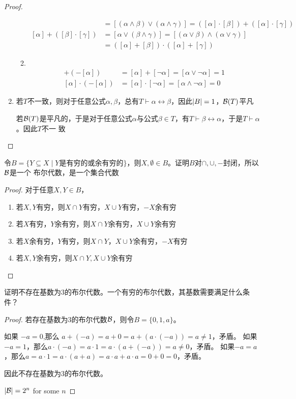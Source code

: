\documentclass[11pt]{article}
\begin{document}
\begin{proof}
\begin{enumerate}
\begin{enumerate}
\begin{align*}
 &=[(\alpha\wedge\beta)\vee(\alpha\wedge\gamma)]=([\alpha]\cdot[\beta])+([\alpha]\cdot[\gamma])\\
 [\alpha]+([\beta]\cdot[\gamma])&=[\alpha\vee(\beta\wedge\gamma)]=[(\alpha\vee\beta)\wedge(\alpha\vee\gamma)]\\
 &=([\alpha]+[\beta])\cdot([\alpha]+[\gamma])
\end{align*}
\item ​
\begin{align*}
[\alpha]+(-[\alpha])&=[\alpha]+[\neg\alpha]=[\alpha\vee\neg\alpha]=1\\
[\alpha]\cdot(-[\alpha])&=[\alpha]\cdot[\neg\alpha]=[\alpha\wedge\neg\alpha]=0
\end{align*}
\end{enumerate}
\item 若\(T\)不一致，则对于任意公式\(\alpha,\beta\)，总有\(T\vdash\alpha\leftrightarrow\beta\)，因此\(\abs{B}=1\)，\(\mathcal{B}(T)\)平凡

若\(\mathcal{B}(T)\)是平凡的，于是对于任意公式\(\alpha\)与公式\(\beta\in T\)，有\(T\vdash\beta\leftrightarrow\alpha\)，于是\(T\vdash\alpha\)。因此\(T\)不一
致
\end{enumerate}
\end{proof}

\begin{exercise}[1.1.8]
令\(B=\{Y\subseteq X\mid Y\text{是有穷的或余有穷的}\}\)，则\(X,\emptyset\in B\)。证明\(B\)对\(\cap,\cup,-\)封闭，所以\(\mathcal{B}\)是一个
布尔代数，是一个集合代数
\end{exercise}

\begin{proof}
对于任意\(X,Y\in B\)，
\begin{enumerate}
\item 若\(X,Y\)有穷，则\(X\cap Y\)有穷，\(X\cup Y\)有穷，\(-X\)余有穷
\item 若\(X\)有穷，\(Y\)余有穷，则\(X\cap Y\)余有穷，\(X\cup Y\)余有穷
\item 若\(X\)余有穷，\(Y\)有穷，则\(X\cap Y，X\cup Y\)余有穷，\(-X\)有穷
\item 若\(X,Y\)余有穷，则\(X\cap Y,X\cup Y\)余有穷
\end{enumerate}
\end{proof}

\begin{exercise}[1.1.9]
证明不存在基数为3的布尔代数。一个有穷的布尔代数，其基数需要满足什么条件？
\end{exercise}

\begin{proof}
若存在基数为3的布尔代数\(\mathcal{B}\)，则令\(B=\{0,1,a\}\)。

如果 \(-a=0\),那么 \(a+(-a)=a+0=a+(a\cdot(-a))=a\neq 1\)，矛盾。
如果\(-a=1\)，那么\(a\cdot(-a)=a\cdot 1=a\cdot(a+(-a))=a\neq 0\)，矛盾。
如果\(-a=a\)，那么\(a=a\cdot 1=a\cdot(a+a)=a\cdot a+a\cdot a=0+0=0\)，矛盾。

因此不存在基数为3的布尔代数。

\(\abs{\calb}=2^n\) for some \(n\)
\end{proof}
\end{document}
